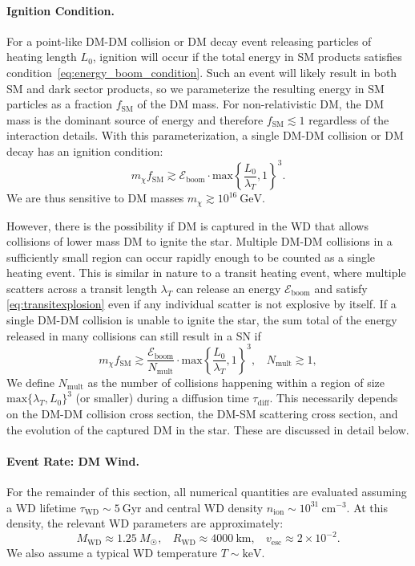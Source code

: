 \documentclass[preprintnumbers,amsmath,amssymb,prd,superscriptaddress]{revtex4}
\newcommand{\Eboom}{\mathcal{E}_\text{boom}}
\newcommand{\GeV}{\text{GeV}}
\newcommand{\cm}{\text{cm}}
\begin{document}
\paragraph{Ignition Condition.}
For a point-like DM-DM collision or DM decay event releasing particles of heating length $L_0$, ignition will occur if the total energy in SM products satisfies condition~\eqref{eq:energy_boom_condition}.
Such an event will likely result in both SM and dark sector products, so we parameterize the resulting energy in SM particles as a fraction $f_\text{SM}$ of the DM mass.
For non-relativistic DM, the DM mass is the dominant source of energy and therefore $f_\text{SM} \lesssim 1$ regardless of the interaction details.
With this parameterization, a single DM-DM collision or DM decay has an ignition condition:
\begin{equation}
\label{eq:coldecay}
  m_\chi f_\text{SM}  \gtrsim \Eboom \cdot \text{max} \left \{\frac{L_0}{\lambda_T}, 1 \right \}^3.
\end{equation}
We are thus sensitive to DM masses $m_\chi \gtrsim 10^{16} ~\GeV$.

However, there is the possibility if DM is captured in the WD that allows collisions of lower mass DM to ignite the star. 
Multiple DM-DM collisions in a sufficiently small region can occur rapidly enough to be counted as a single heating event.
This is similar in nature to a transit heating event, where multiple scatters across a transit length $\lambda_T$ can release an energy $\Eboom$ and satisfy \eqref{eq:transitexplosion} even if any individual scatter is not explosive by itself.   
If a single DM-DM collision is unable to ignite the star, the sum total of the energy released in many collisions can still result in a SN if
\begin{equation}
\label{eq:multcolboom}
 m_\chi f_\text{SM} \gtrsim \frac{\Eboom}{N_\text{mult}} \cdot \text{max} \left \{\frac{L_0}{\lambda_T}, 1 \right \}^3, ~~~~ N_\text{mult} \gtrsim 1,
\end{equation}
We define $N_\text{mult}$ as the number of collisions happening within a region of size $\text{max}\{\lambda_T,L_0\}^3$ (or smaller) during a diffusion time $\tau_\text{diff}$.
This necessarily depends on the DM-DM collision cross section, the DM-SM scattering cross section, and the evolution of the captured DM in the star. 
These are discussed in detail below. 

\paragraph{Event Rate: DM Wind.}
For the remainder of this section, all numerical quantities are evaluated assuming a WD lifetime $\tau_\text{WD} \sim 5 ~\text{Gyr}$ and central WD density $n_\text{ion} \sim 10^{31} ~\cm^{-3}$. 
At this density, the relevant WD parameters are approximately: 
\begin{equation}
M_\text{WD} \approx 1.25 ~M_{\astrosun}, ~~~~ R_\text{WD} \approx 4000 ~\text{km}, ~~~~ v_\text{esc} \approx 2 \times 10^{-2}. 
\end{equation}
We also assume a typical WD temperature $T \sim \text{keV}$.
\end{document}
